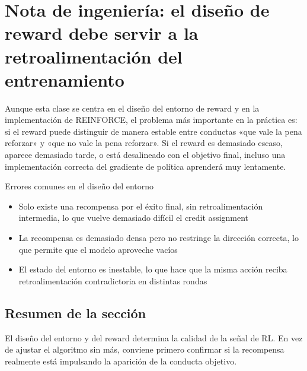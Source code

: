 \section{Nota de ingeniería: el diseño de reward debe servir a la retroalimentación del entrenamiento}
Aunque esta clase se centra en el diseño del entorno de reward y en la implementación de REINFORCE, el problema más importante en la práctica es: si el reward puede distinguir de manera estable entre conductas «que vale la pena reforzar» y «que no vale la pena reforzar». Si el reward es demasiado escaso, aparece demasiado tarde, o está desalineado con el objetivo final, incluso una implementación correcta del gradiente de política aprenderá muy lentamente.

\begin{warningbox}{Errores comunes en el diseño del entorno}
\begin{itemize}
  \item Solo existe una recompensa por el éxito final, sin retroalimentación intermedia, lo que vuelve demasiado difícil el credit assignment
  \item La recompensa es demasiado densa pero no restringe la dirección correcta, lo que permite que el modelo aproveche vacíos
  \item El estado del entorno es inestable, lo que hace que la misma acción reciba retroalimentación contradictoria en distintas rondas
\end{itemize}
\end{warningbox}

\subsection{Resumen de la sección}
El diseño del entorno y del reward determina la calidad de la señal de RL. En vez de ajustar el algoritmo sin más, conviene primero confirmar si la recompensa realmente está impulsando la aparición de la conducta objetivo.

\newpage
